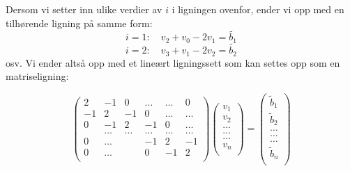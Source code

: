 \documentclass{article}
\begin{document}
Dersom vi setter inn ulike verdier av $i$ i ligningen ovenfor, ender vi opp med en tilhørende ligning på samme form:
\[i=1: \quad v_2 + v_0 - 2v_1 = \tilde{b_1}\]
\[i=2: \quad v_3 + v_1 -2v_2 = \tilde{b_2}\]
osv.
Vi ender altså opp med et lineært ligningssett som kan settes opp som en matriseligning:

\begin{equation}
    \left(\begin{array}{cccccc}
                           2& -1& 0 &\dots   & \dots &0 \\
                           -1 & 2 & -1 &0 &\dots &\dots \\
                           0&-1 &2 & -1 & 0 & \dots \\
                           & \dots   & \dots &\dots   &\dots & \dots \\
                           0&\dots   &  &-1 &2& -1 \\
                           0&\dots    &  & 0  &-1 & 2 \\
                      \end{array} \right)\left(\begin{array}{c}
                           v_1\\
                           v_2\\
                           \dots \\
                          \dots  \\
                          \dots \\
                           v_n\\
                      \end{array} \right)
  =\left(\begin{array}{c}
                           \tilde{b}_1\\
                           \tilde{b}_2\\
                           \dots \\
                           \dots \\
                          \dots \\
                           \tilde{b}_n\\
                      \end{array} \right)
\end{equation}
\end{document}
